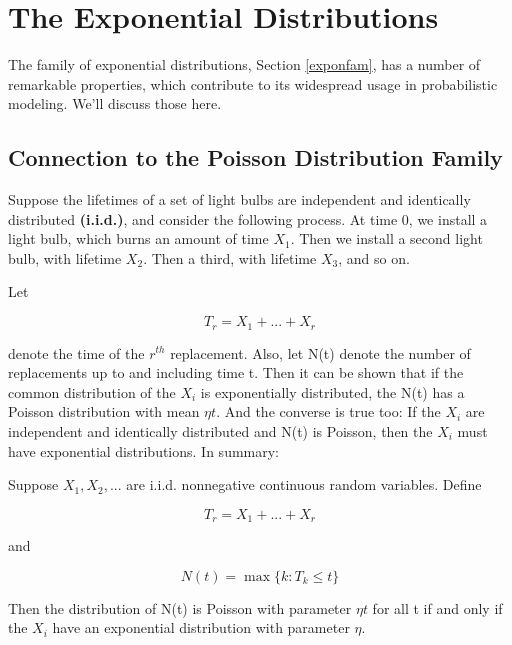 \chapter{The Exponential Distributions}
\label{chap:expondistr}

The family of exponential distributions, Section \ref{exponfam}, has a
number of remarkable properties, which contribute to its widespread
usage in probabilistic modeling.  We'll discuss those here.

\section{Connection to the Poisson Distribution Family}
\label{connpoi}

Suppose the lifetimes of a set of light bulbs are independent and
identically distributed {\bf (i.i.d.)}, and consider the following
process.  At time 0, we install a light bulb, which burns an amount of
time $X_1$.  Then we install a second light bulb, with lifetime $X_2$.
Then a third, with lifetime $X_3$, and so on.  

Let 

\begin{equation}
\label{ti}
T_r = X_1+...+X_r
\end{equation}

denote the time of the $r^{th}$ replacement.  Also, let N(t) denote the
number of replacements up to and including time t.  Then it can be shown
that if the common distribution of the $X_i$ is exponentially
distributed, the N(t) has a Poisson distribution with mean $\eta t$.
And the converse is true too:  If the $X_i$ are independent and
identically distributed and N(t) is Poisson, then the $X_i$ must have
exponential distributions.  In summary:

\begin{theorem}
Suppose $X_1, X_2, ...$ are i.i.d. nonnegative continuous random
variables.  Define

\begin{equation}
T_r = X_1+...+X_r
\end{equation}

and 

\begin{equation}
N(t) = \max\{k: T_k \leq t\}
\end{equation}

Then the distribution of N(t) is Poisson with parameter $\eta t$ for
all t if and only if the $X_i$ have an exponential distribution with
parameter $\eta$.

\end{theorem}

